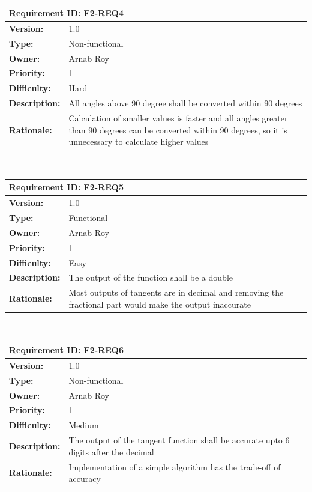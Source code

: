 \documentclass[paper=a4, fontsize=11pt,twoside]{scrartcl}	%
\begin{document}
    \\[10pt]
    \begin{tabular}{ |p{4cm} | p{10cm}| }
     \hline
     \multicolumn{2}{|l|}{\textbf{Requirement ID: F2-REQ4}} \\
     \hline
     \textbf{Version:} & 1.0\\
     \textbf{Type:} & Non-functional\\
     \textbf{Owner:} & Arnab Roy\\
     \textbf{Priority:} & 1\\
     \textbf{Difficulty:} & Hard\\
     \textbf{Description:} & All angles above 90 degree shall be converted within 90 degrees\\
     \textbf{Rationale:} & Calculation of smaller values is faster and all angles greater than 90 degrees can be converted within 90 degrees, so it is unnecessary to calculate higher values\\
     \hline
    \end{tabular}
    \\[10pt]
    \begin{tabular}{ |p{4cm} | p{10cm}| }
     \hline
     \multicolumn{2}{|l|}{\textbf{Requirement ID: F2-REQ5}} \\
     \hline
     \textbf{Version:} & 1.0\\
     \textbf{Type:} & Functional\\
     \textbf{Owner:} & Arnab Roy\\
     \textbf{Priority:} & 1\\
     \textbf{Difficulty:} & Easy\\
     \textbf{Description:} & The output of the function shall be a double\\
     \textbf{Rationale:} & Most outputs of tangents are in decimal and removing the fractional part would make the output inaccurate\\
     \hline
    \end{tabular}
    \\[10pt]
    \begin{tabular}{ |p{4cm} | p{10cm}| }
     \hline
     \multicolumn{2}{|l|}{\textbf{Requirement ID: F2-REQ6}}\\
     \hline
     \textbf{Version:} & 1.0\\
     \textbf{Type:} & Non-functional\\
     \textbf{Owner:} & Arnab Roy\\
     \textbf{Priority:} & 1\\
     \textbf{Difficulty:} & Medium\\
     \textbf{Description:} & The output of the tangent function shall be accurate upto 6 digits after the decimal\\
     \textbf{Rationale:} & Implementation of a simple algorithm has the trade-off of accuracy\\
     \hline
    \end{tabular}
\end{document}
